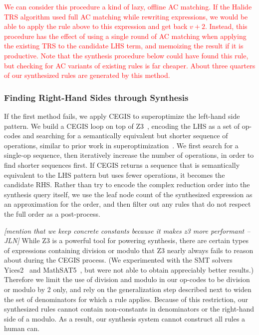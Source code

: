 \documentclass[acmsmall,review]{acmart}\settopmatter{printfolios=true,printccs=false,printacmref=false}
\newcommand{\jln}[1]{\textcolor{uwpurple}{\textit{[{#1} --JLN]}}}
\newcommand{\modified}[1]{\textcolor{red}{{#1}}}
\begin{document}
\modified{We can consider this procedure a kind of lazy, offline AC matching. If the Halide TRS algorithm 
used full AC matching while rewriting expressions, we would be able to apply the rule above to this 
expression and get back $v + 2$. Instead, this procedure has the effect of using a single 
round of AC matching when applying the existing TRS to the candidate LHS term, and 
memoizing the result if it is productive. 
Note that the synthesis procedure below could have found this rule, but checking for AC
variants of existing rules is far cheaper. About three quarters of our synthesized rules are generated by this method.}


\subsubsection{Finding Right-Hand Sides through Synthesis}
\label{sec:rhssynthesis}
If the first method fails, we apply CEGIS to superoptimize the left-hand side pattern.
We build a CEGIS loop on top of Z3~\cite{de2008z3}, encoding the LHS as a set of op-codes
and searching for a semantically equivalent but shorter sequence of operations, similar
to prior work in superoptimization~\cite{regehr2018superoptimization, mangpo2016superoptimization}.
We first search for a single-op sequence,
then iteratively increase the number of operations, in order to find shorter sequences
first.  If CEGIS returns a sequence that is semantically equivalent to the LHS pattern but uses fewer
operations, it becomes the candidate RHS. Rather than try to encode the complex reduction order into the synthesis query itself, we use the leaf node count of the synthesized expression as an approximation for the order, and then filter out any rules that do not respect the full order as a post-process. 

\jln{mention that we keep concrete constants because it makes z3 more performant}
While Z3 is a powerful tool for powering synthesis, there are certain types of expressions 
containing division or modulo that Z3 nearly always fails to reason about during the CEGIS process. (We experimented with the SMT solvers Yices2~\cite{jovanovic2017solving} and MathSAT5~\cite{mathsat5}, but were not able to obtain appreciably better results.)
Therefore we limit the use of division and modulo in our op-codes to be division
or modulo by 2 only, and rely on the generalization step described next to
widen the set of denominators for which a rule applies.  Because of this
restriction, our synthesized rules cannot contain non-constants in denominators
or the right-hand side of a modulo.  As a result, our synthesis system cannot
construct all rules a human can.
\end{document}
